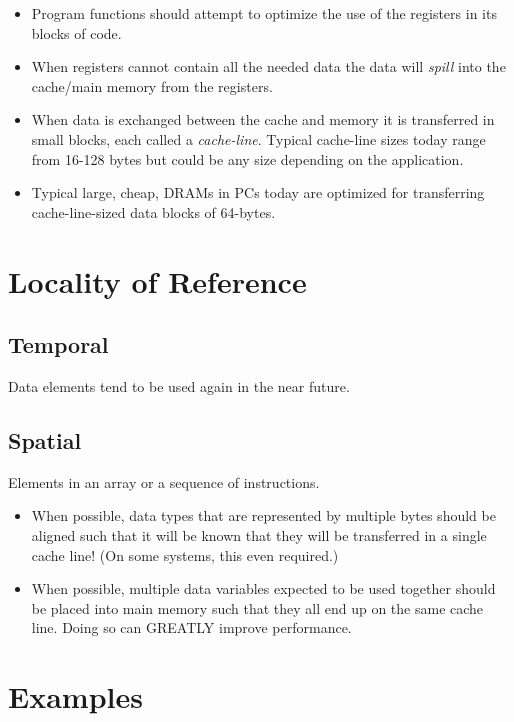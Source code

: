 \documentclass[10pt]{article}
\begin{document}
\begin{itemize}
\item Program functions should attempt to optimize the use of the registers in its blocks of code.

\item When registers cannot contain all the needed data the data will {\em spill} into the
	cache/main memory from the registers.

\item When data is exchanged between the cache and memory it is transferred in small 
	blocks, each called a {\em cache-line}.  Typical cache-line sizes today range from 
	16-128 bytes but could be any size depending on the application.

\item Typical large, cheap, DRAMs in PCs today are optimized for transferring cache-line-sized 
	data blocks of 64-bytes.
\end{itemize}




\section{Locality of Reference}

\subsection{Temporal}
	Data elements tend to be used again in the near future.
\subsection{Spatial}
	Elements in an array or a sequence of instructions. 

\begin{itemize}
\item When possible, data types that are represented by multiple bytes should be aligned 
such that it will be known that they will be transferred in a single cache line!
(On some systems, this even required.)
\item When possible, multiple data variables expected to be used together should
be placed into main memory such that they all end up on the same cache line.
Doing so can GREATLY improve performance.
\end{itemize}


\section{Examples}
\end{document}

